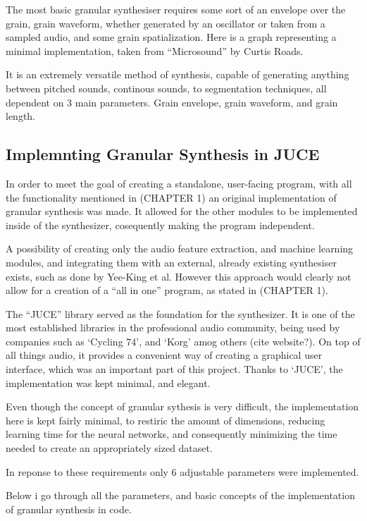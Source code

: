 The most basic granular synthesiser requires some sort of an envelope
over the grain, grain waveform, whether generated by an oscillator or
taken from a sampled audio, and some grain spatialization. Here is a
graph representing a minimal implementation, taken from ``Microsound''
by Curtis Roads.

It is an extremely versatile method of synthesis, capable of
generating anything between pitched sounds, continous sounds, to
segmentation techniques, all dependent on 3 main parameters. Grain
envelope, grain waveform, and grain length.

\subsection{Implemnting Granular Synthesis in JUCE}
In order to meet the goal of creating a standalone, user-facing
program, with all the functionality mentioned in (CHAPTER 1) an
original implementation of granular synthesis was made. It allowed for
the other modules to be implemented inside of the synthesizer,
cosequently making the program independent.

A possibility of creating only the audio feature extraction, and
machine learning modules, and integrating them with an external,
already existing synthesiser exists, such as done by Yee-King et
al. However this approach would clearly not allow for a creation of a
``all in one'' program, as stated in (CHAPTER 1).

The ``JUCE'' library served as the foundation for the synthesizer. It
is one of the most established libraries in the professional audio
community, being used by companies such as `Cycling 74', and `Korg'
amog others (cite website?).  On top of all things audio, it provides
a convenient way of creating a graphical user interface, which was an
important part of this project.  Thanks to `JUCE', the implementation
was kept minimal, and elegant.

Even though the concept of granular sythesis is very difficult, the
implementation here is kept fairly minimal, to restiric the amount of
dimensions, reducing learning time for the neural networks, and
consequently minimizing the time needed to create an appropriately
sized dataset.

In reponse to these requirements only 6 adjustable parameters were
implemented.

Below i go through all the parameters, and basic concepts of the
implementation of granular synthesis in code.

